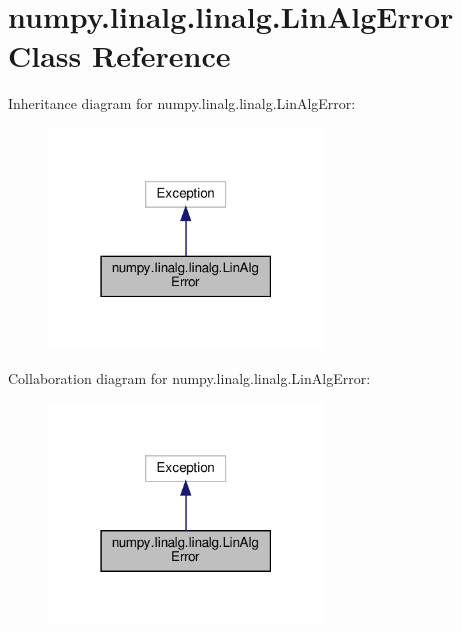 \hypertarget{classnumpy_1_1linalg_1_1linalg_1_1LinAlgError}{}\section{numpy.\+linalg.\+linalg.\+Lin\+Alg\+Error Class Reference}
\label{classnumpy_1_1linalg_1_1linalg_1_1LinAlgError}


Inheritance diagram for numpy.\+linalg.\+linalg.\+Lin\+Alg\+Error\+:
\nopagebreak
\begin{figure}[H]
\begin{center}
\leavevmode
\includegraphics[width=207pt]{classnumpy_1_1linalg_1_1linalg_1_1LinAlgError__inherit__graph}
\end{center}
\end{figure}


Collaboration diagram for numpy.\+linalg.\+linalg.\+Lin\+Alg\+Error\+:
\nopagebreak
\begin{figure}[H]
\begin{center}
\leavevmode
\includegraphics[width=207pt]{classnumpy_1_1linalg_1_1linalg_1_1LinAlgError__coll__graph}
\end{center}
\end{figure}


